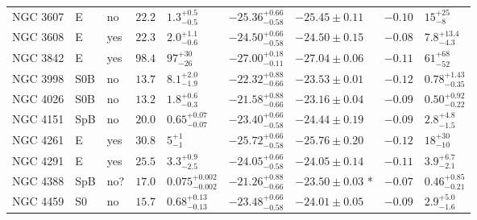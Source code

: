 \begin{table*}
\begin{center}
\begin{tabular}{lllllllll}
NGC 3607  &  E  &  no   &  $22.2$  &  $1.3_{-0.5}^{+0.5}$   &  $-25.36_{-0.58}^{+0.66}$   &  $-25.45 \pm 0.11$   &  $-0.10$  &  $15_{-8}^{+25}$   \\ 
NGC 3608  &  E  &  yes   &  $22.3$  &  $2.0_{-0.6}^{+1.1}$   &  $-24.50_{-0.58}^{+0.66}$   &  $-24.50 \pm 0.15$   &  $-0.08$  &  $7.8_{-4.3}^{+13.4}$   \\ 
NGC 3842  &  E  &  yes   &  $98.4$  &  $97_{-26}^{+30}$   &  $-27.00_{-0.11}^{+0.18}$   &  $-27.04 \pm 0.06$   &  $-0.11$  &  $61_{-52}^{+68}$   \\ 
NGC 3998  &  S0B  &  no   &  $13.7$  &  $8.1_{-1.9}^{+2.0}$   &  $-22.32_{-0.66}^{+0.88}$   &  $-23.53 \pm 0.01$   &  $-0.12$  &  $0.78_{-0.35}^{+1.43}$   \\ 
NGC 4026  &  S0B  &  no   &  $13.2$  &  $1.8_{-0.3}^{+0.6}$   &  $-21.58_{-0.66}^{+0.88}$   &  $-23.16 \pm 0.04$   &  $-0.09$  &  $0.50_{-0.22}^{+0.92}$   \\ 
NGC 4151  &  SpB  &  no   &  $20.0$  &  $0.65_{-0.07}^{+0.07}$   &  $-23.40_{-0.58}^{+0.66}$   &  $-24.44 \pm 0.19$   &  $-0.09$  &  $2.8_{-1.5}^{+4.8}$   \\ 
NGC 4261  &  E  &  yes   &  $30.8$  &  $5_{-1}^{+1}$   &  $-25.72_{-0.58}^{+0.66}$   &  $-25.76 \pm 0.20$   &  $-0.12$  &  $18_{-10}^{+30}$   \\ 
NGC 4291  &  E  &  yes   &  $25.5$  &  $3.3_{-2.5}^{+0.9}$   &  $-24.05_{-0.58}^{+0.66}$   &  $-24.05 \pm 0.14$   &  $-0.11$  &  $3.9_{-2.1}^{+6.7}$   \\ 
NGC 4388  &  SpB  &  no?  &  $17.0$  &  $0.075_{-0.002}^{+0.002}$   &  $-21.26_{-0.66}^{+0.88}$   &  $-23.50 \pm 0.03$  *  &  $-0.07$  &  $0.46_{-0.21}^{+0.85}$   \\ 
NGC 4459  &  S0  &  no   &  $15.7$  &  $0.68_{-0.13}^{+0.13}$   &  $-23.48_{-0.58}^{+0.66}$   &  $-24.01 \pm 0.05$   &  $-0.09$  &  $2.9_{-1.6}^{+5.0}$   \\ 
\hline         
\end{tabular}   
\label{tab:sample} 
\end{center}    
\end{table*}    

